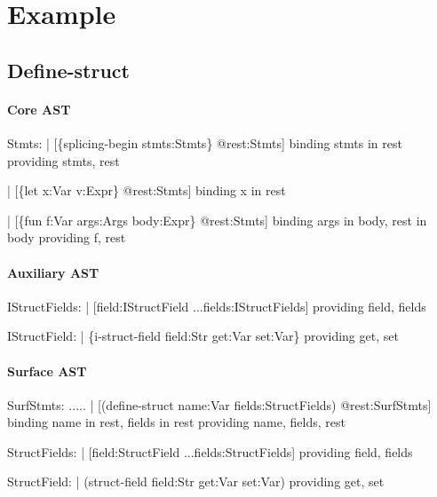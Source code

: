 \newpage
\section{Example}

\subsection{Define-struct}

\paragraph{Core AST}
\begin{Codes}
Stmts:
| [\{splicing-begin stmts:Stmts\} @rest:Stmts]
   binding stmts in rest
   providing stmts, rest

| [\{let x:Var v:Expr\} @rest:Stmts]
   binding x in rest

| [\{fun f:Var args:Args body:Expr\} @rest:Stmts]
   binding args in body, rest in body
   providing f, rest
\end{Codes}







\paragraph{Auxiliary AST}
\begin{Codes}
IStructFields:
| [field:IStructField ...fields:IStructFields]
  providing field, fields

IStructField:
| \{i-struct-field field:Str get:Var set:Var\}
  providing get, set
\end{Codes}

\paragraph{Surface AST}
\begin{Codes}
SurfStmts:
  .....
| [(define-struct name:Var fields:StructFields) @rest:SurfStmts]
  binding name in rest, fields in rest
  providing name, fields, rest

StructFields:
| [field:StructField ...fields:StructFields]
  providing field, fields

StructField:
| (struct-field field:Str get:Var set:Var)
  providing get, set
\end{Codes}

